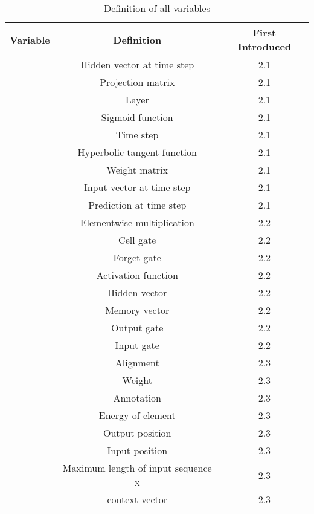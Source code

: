 \documentclass[preprint,12pt,3p]{elsarticle}
\begin{document}
 \begin{table*}[htpb]
 \centering
 \caption{Definition of all variables}
\label{tab:perf_tab}


\begin{adjustbox}{width=0.71 \linewidth}

 \begin{tabularx}{1.55 \textwidth}{|c|C|c|}

       \hline
    Variable & Definition & {First Introduced} \\
    \hline
     & Hidden vector at time step  & 2.1 \\
    \hline
       & Projection matrix & 2.1 \\
    \hline
       & Layer & 2.1 \\
    \hline
     & Sigmoid function & 2.1 \\
    \hline
       & Time step & 2.1 \\
    \hline
     & Hyperbolic tangent function & 2.1 \\
    \hline
       & Weight matrix & 2.1 \\
    \hline
     & Input vector at time step  & 2.1 \\
    \hline
     & Prediction at time step  & 2.1 \\
    \hline
     & Elementwise multiplication & 2.2 \\
    \hline
       & Cell gate & 2.2 \\
    \hline
       & Forget gate & 2.2 \\
    \hline
       & Activation function & 2.2 \\
    \hline
       & Hidden vector & 2.2 \\
    \hline
       & Memory vector & 2.2 \\
    \hline
       & Output gate & 2.2 \\
    \hline
       & Input gate & 2.2 \\
    \hline
       & Alignment & 2.3 \\
    \hline
     & Weight & 2.3 \\
    \hline
     & Annotation & 2.3 \\
    \hline
     & Energy of element & 2.3 \\
    \hline
       & Output position & 2.3 \\
    \hline
       & Input position & 2.3 \\
    \hline
     & Maximum length of input sequence x & 2.3 \\
    \hline
       & context vector & 2.3 \\

\end{tabularx}
\end{adjustbox}
\end{table*}
\end{document}
